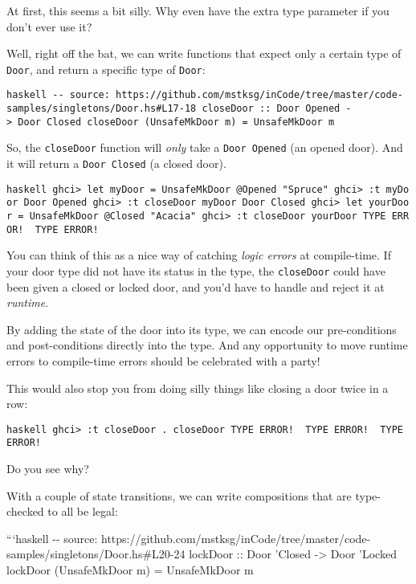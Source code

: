 \documentclass[]{article}
\begin{document}
At first, this seems a bit silly. Why even have the extra type parameter if you
don't ever use it?

Well, right off the bat, we can write functions that expect only a certain type
of \texttt{Door}, and return a specific type of \texttt{Door}:

\texttt{haskell\ -\/-\ source:\ https://github.com/mstksg/inCode/tree/master/code-samples/singletons/Door.hs\#L17-18\ closeDoor\ ::\ Door\ \textquotesingle{}Opened\ -\textgreater{}\ Door\ \textquotesingle{}Closed\ closeDoor\ (UnsafeMkDoor\ m)\ =\ UnsafeMkDoor\ m}

So, the \texttt{closeDoor} function will \emph{only} take a
\texttt{Door\ \textquotesingle{}Opened} (an opened door). And it will return a
\texttt{Door\ \textquotesingle{}Closed} (a closed door).

\texttt{haskell\ ghci\textgreater{}\ let\ myDoor\ =\ UnsafeMkDoor\ @\textquotesingle{}Opened\ "Spruce"\ ghci\textgreater{}\ :t\ myDoor\ Door\ \textquotesingle{}Opened\ ghci\textgreater{}\ :t\ closeDoor\ myDoor\ Door\ \textquotesingle{}Closed\ ghci\textgreater{}\ let\ yourDoor\ =\ UnsafeMkDoor\ @\textquotesingle{}Closed\ "Acacia"\ ghci\textgreater{}\ :t\ closeDoor\ yourDoor\ TYPE\ ERROR!\ \ TYPE\ ERROR!}

You can think of this as a nice way of catching \emph{logic errors} at
compile-time. If your door type did not have its status in the type, the
\texttt{closeDoor} could have been given a closed or locked door, and you'd have
to handle and reject it at \emph{runtime}.

By adding the state of the door into its type, we can encode our pre-conditions
and post-conditions directly into the type. And any opportunity to move runtime
errors to compile-time errors should be celebrated with a party!

This would also stop you from doing silly things like closing a door twice in a
row:

\texttt{haskell\ ghci\textgreater{}\ :t\ closeDoor\ .\ closeDoor\ TYPE\ ERROR!\ \ TYPE\ ERROR!\ \ TYPE\ ERROR!}

Do you see why?

With a couple of state transitions, we can write compositions that are
type-checked to all be legal:

```haskell -\/- source:
https://github.com/mstksg/inCode/tree/master/code-samples/singletons/Door.hs\#L20-24
lockDoor :: Door 'Closed -\textgreater{} Door 'Locked lockDoor (UnsafeMkDoor m)
= UnsafeMkDoor m
\end{document}
